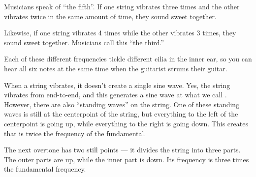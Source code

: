 Musicians speak of ``the fifth''.  If one string vibrates three times
and the other vibrates twice in the same amount of time, they sound
sweet together.

Likewise, if one string vibrates 4 times while the other vibrates 3 times, they
sound sweet together. Musicians call this ``the third.''

Each of these different frequencies tickle different cilia in the
inner ear, so you can hear all six notes at the same time when
the guitarist strums their guitar.

When a string vibrates, it doesn't create a single sine wave. Yes, the
string vibrates from end-to-end, and this generates a sine wave at what
we call . However, there are also
``standing waves'' on the string. One of these standing waves is
still at the centerpoint of the string, but everything to the left of
the centerpoint is going up, while everything to the right is going
down. This creates  that is twice the frequency
of the fundamental.


The next overtone has two still points --- it divides the string into
three parts.  The outer parts are up, while the inner part is
down. Its frequency is three times the fundamental frequency.


